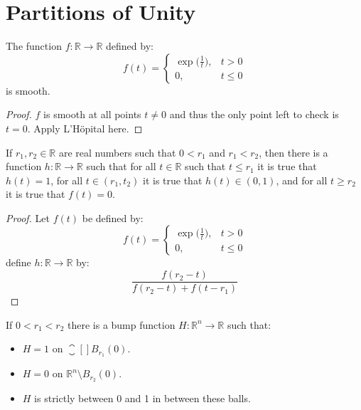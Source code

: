\section{Partitions of Unity}
        \begin{theorem}
            The function $f:\mathbb{R}\rightarrow\mathbb{R}$ defined by:
            \begin{equation}
                f(t)=
                \begin{cases}
                    \exp\big(\frac{1}{t}\big),&t>0\\
                    0,&t\leq{0}
                \end{cases}
            \end{equation}
            is smooth.
        \end{theorem}
        \begin{proof}
            $f$ is smooth at all points $t\ne{0}$ and thus the only point left
            to check is $t=0$. Apply L'H\"{o}pital here.
        \end{proof}
        \begin{theorem}
            If $r_{1},r_{2}\in\mathbb{R}$ are real numbers such that
            $0<r_{1}$ and $r_{1}<r_{2}$, then there is a function
            $h:\mathbb{R}\rightarrow\mathbb{R}$ such that for all
            $t\in\mathbb{R}$ such that $t\leq{r}_{1}$ it is true that $h(t)=1$,
            for all $t\in(r_{1},t_{2})$ it is true that $h(t)\in(0,1)$, and
            for all $t\geq{r}_{2}$ it is true that $f(t)=0$.
        \end{theorem}
        \begin{proof}
            Let $f(t)$ be defined by:
            \begin{equation}
                f(t)=
                \begin{cases}
                    \exp\big(\frac{1}{t}\big),&t>0\\
                    0,&t\leq{0}
                \end{cases}
            \end{equation}
            define $h:\mathbb{R}\rightarrow\mathbb{R}$ by:
            \begin{equation}
                \frac{f(r_{2}-t)}{f(r_{2}-t)+f(t-r_{1})}
            \end{equation}
        \end{proof}
        \begin{theorem}
            If $0<r_{1}<r_{2}$ there is a bump function
            $H:\mathbb{R}^{n}\rightarrow\mathbb{R}$ such that:
            \begin{itemize}
                \item $H=1$ on $\closure[]{B_{r_{1}}(0)}$.
                \item $H=0$ on $\mathbb{R}^{n}\setminus{B}_{r_{2}}(0)$.
                \item $H$ is strictly between 0 and 1 in between these balls.
            \end{itemize}
        \end{theorem}
